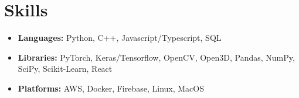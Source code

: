 \documentclass[a4paper,11pt]{article}
\newcommand{\resumeItem}[1]{
  \item\small{#1}
}
\newcommand{\resumeItemListStart}{\begin{itemize}[rightmargin=0.11in]}
\newcommand{\resumeItemListEnd}{\end{itemize}}
\begin{document}




\section{Skills}
    \resumeItemListStart{}
        \resumeItem{\textbf{Languages:} Python, C++, Javascript/Typescript, SQL}
        \resumeItem{\textbf{Libraries:} PyTorch, Keras/Tensorflow, OpenCV, Open3D, Pandas, NumPy, SciPy, Scikit-Learn, React}
        \resumeItem{\textbf{Platforms:} AWS, Docker, Firebase, Linux, MacOS}
      \resumeItemListEnd{}
\end{document}
